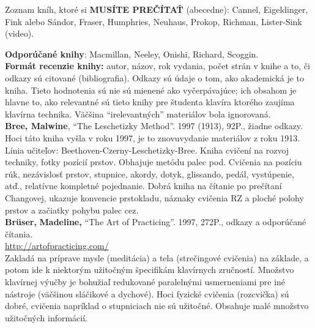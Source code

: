 \documentclass[11pt,a4paper]{book}
\begin{document}

Zoznam kníh, ktoré si \textbf{MUSÍTE PREČÍTAŤ} (abecedne): Cannel, Eigeldinger, Fink alebo Sándor, Fraser, Humphries, Neuhaus, Prokop, Richman, Lister-Sink (video).

\textbf{Odporúčané knihy}: Macmillan, Neeley, Onishi, Richard, Scoggin.
\medskip\\
\textbf{Formát recenzie knihy:} autor, názov, rok vydania, počet strán v knihe a to, či odkazy sú citované (bibliografia). Odkazy sú údaje o tom, ako akademická je to kniha. Tieto hodnotenia sú nie sú mienené ako vyčerpávajúce; ich obsahom je hlavne to, ako relevantné sú tieto knihy pre študenta klavíra ktorého zaujíma klavírna technika. Väčšina “irelevantných” materiálov bola ignorovaná.
\medskip\\
\textbf{Bree, Malwine}, “The Leschetizky Method”. 1997 (1913), 92P., žiadne odkazy. Hoci táto kniha vyšla v roku 1997, je to znovuvydanie materiálov z roku 1913.\\
Línia učiteľov: Beethoven-Czerny-Leschetizky-Bree. Kniha cvičení na rozvoj techniky, fotky pozícií prstov. Obhajuje metódu palec pod. Cvičenia na pozíciu rúk, nezávislosť prstov, stupnice, akordy, dotyk, glissando, pedál, vystúpenie, atď., relatívne kompletné pojednanie. Dobrá kniha na čítanie po prečítaní Changovej, ukazuje konvencie prstokladu, náznaky cvičenia RZ a ploché polohy prstov a začiatky pohybu palec cez. 
\medskip\\
\textbf{Brüser}\textbf{, }\textbf{Madeline}\textbf{,} “The Art of Practicing”. 1997, 272P., odkazy a odporúčané čítania.\\\href{http://artofpracticing.com/}{http://artofpracticing.com/}\\ Zakladá na príprave mysle (meditácia) a tela (strečingové cvičenia) na základe, a potom ide k niektorým užitočným špecifikám klavírnych zručností. Množstvo klavírnej výučby je bohužiaľ redukované paralelnými  usmerneniami pre iné nástroje (väčšinou sláčikové a dychové). Hoci fyzické cvičenia (rozcvička) sú dobré, cvičenia napríklad o stupniciach nie sú užitočné. Obsahuje malé množstvo užitočných informácií.
\medskip\\
\end{document}
